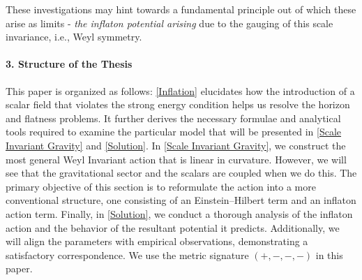 \documentclass[aps,prd,reprint,preprintnumbers,showpacs,floatfix,nofootinbib,superscript address]{revtex4-2}
\newcommand{\wb}[1]{{\color[RGB]{255,0,0}{\textbf{\textit{[WB: #1]}}}}}
\newcommand{\pcs}[1]{{\color[RGB]{0,100,0}{\textbf{\textit{[PCS: #1]}}}}}
\begin{document}

These investigations may hint towards a fundamental principle out of which these arise as limits - \textit{the inflaton potential arising} due to the gauging of this scale invariance, i.e., Weyl symmetry.

\paragraph*{3. Structure of the Thesis} This paper is organized as follows: \cref{Inflation} elucidates how the introduction of a scalar field that violates the strong energy condition helps us resolve the horizon and flatness problems. It further derives the necessary formulae and analytical tools required to examine the particular model that will be presented in \cref{Scale Invariant Gravity} and \cref{Solution}. In \cref{Scale Invariant Gravity}, we construct the most general Weyl Invariant action that is linear in curvature. However, we will see that the gravitational sector and the scalars are coupled when we do this. The primary objective of this section is to reformulate the action into a more conventional structure, one consisting of an Einstein--Hilbert term and an inflaton action term. Finally, in \cref{Solution}, we conduct a thorough analysis of the inflaton action and the behavior of the resultant potential it predicts. Additionally, we will align the parameters with empirical observations, demonstrating a satisfactory correspondence. We use the metric signature $(+,-,-,-)$ in this paper.
\end{document}
